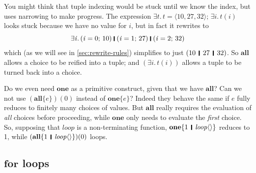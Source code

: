 \documentclass[acmsmall,review,anonymous,dvipsnames]{acmart}
\newcommand{\Varid}[1]{\mathit{#1}}
\begin{document}
You might think that tuple indexing would be stuck until we know the index,
but \versecalc{} uses narrowing to make progress.
The expression \ensuremath{\exists\Varid{t}.\,\Varid{t}\mathrel{=}\langle{}\mathrm{10},\mathrm{27},\mathrm{32}\rangle;\,\exists\Varid{i}.\,\Varid{t}(\Varid{i})}
looks stuck because we have no value for \ensuremath{\Varid{i}}, but in fact it rewrites to
$$
\ensuremath{\exists\Varid{i}.\,(\Varid{i}\mathrel{=}\mathrm{0};\,\mathrm{10})\;\rule[-0.3mm]{0.5mm}{2.5mm}\;(\Varid{i}\mathrel{=}\mathrm{1};\,\mathrm{27})\;\rule[-0.3mm]{0.5mm}{2.5mm}\;(\Varid{i}\mathrel{=}\mathrm{2};\,\mathrm{32})}
$$
which (as we will see in \cref{sec:rewrite-rules}) simplifies
to just \ensuremath{(\mathrm{10}\hspace{1mm}\mathop{\rule[-0.3mm]{0.5mm}{2.5mm}}\hspace{1mm}\mathrm{27}\hspace{1mm}\mathop{\rule[-0.3mm]{0.5mm}{2.5mm}}\hspace{1mm}\mathrm{32})}.
So \ensuremath{\textbf{all}} allows a choice to be reified into a tuple; and \ensuremath{(\exists\Varid{i}.\,\Varid{t}(\Varid{i}))} allows a
tuple to be turned back into a choice.

Do we even need \ensuremath{\textbf{one}} as a primitive construct, given that we have
\ensuremath{\textbf{all}}? Can we not use \ensuremath{(\textbf{all}\{\Varid{e}\})(\mathrm{0})} instead of \ensuremath{\textbf{one}\{\Varid{e}\}}? Indeed
they behave the same if \ensuremath{\Varid{e}} fully reduces to finitely many choices of
values. But \ensuremath{\textbf{all}} really requires the evaluation of \emph{all}
choices before proceeding, while \ensuremath{\textbf{one}} only needs to evaluate the
\emph{first} choice. So, supposing that \ensuremath{\Varid{loop}} is a non-terminating function,
\ensuremath{\textbf{one}\{\mathrm{1}\hspace{1mm}\mathop{\rule[-0.3mm]{0.5mm}{2.5mm}}\hspace{1mm}\Varid{loop}\langle\rangle\}} reduces to 1, while
\ensuremath{(\textbf{all}\{\mathrm{1}\hspace{1mm}\mathop{\rule[-0.3mm]{0.5mm}{2.5mm}}\hspace{1mm}\Varid{loop}\langle\rangle\})(\mathrm{0})} loops.

\subsection{\ensuremath{\textbf{for}} loops} \label{sec:for}
\end{document}
